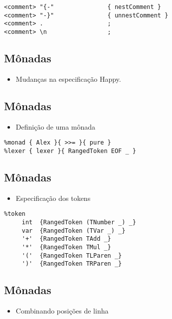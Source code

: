 \documentclass[11pt]{article}
\begin{document}
\begin{verbatim}
<comment> "{-"               { nestComment }
<comment> "-}"               { unnestComment }
<comment> .                  ;
<comment> \n                 ;
\end{verbatim}
\subsection*{Mônadas}
\label{sec:orgb3869bd}

\begin{itemize}
\item Mudanças na especificação Happy.
\end{itemize}
\subsection*{Mônadas}
\label{sec:org52b22d0}

\begin{itemize}
\item Definição de uma mônada
\end{itemize}

\begin{verbatim}
%monad { Alex }{ >>= }{ pure }
%lexer { lexer }{ RangedToken EOF _ }
\end{verbatim}
\subsection*{Mônadas}
\label{sec:org4787bf9}

\begin{itemize}
\item Especificação dos tokens
\end{itemize}

\begin{verbatim}
%token
     int  {RangedToken (TNumber _) _}
     var  {RangedToken (TVar _) _}
     '+'  {RangedToken TAdd _}
     '*'  {RangedToken TMul _}
     '('  {RangedToken TLParen _}
     ')'  {RangedToken TRParen _}
\end{verbatim}
\subsection*{Mônadas}
\label{sec:org910f8ee}

\begin{itemize}
\item Combinando posições de linha
\end{itemize}
\end{document}
